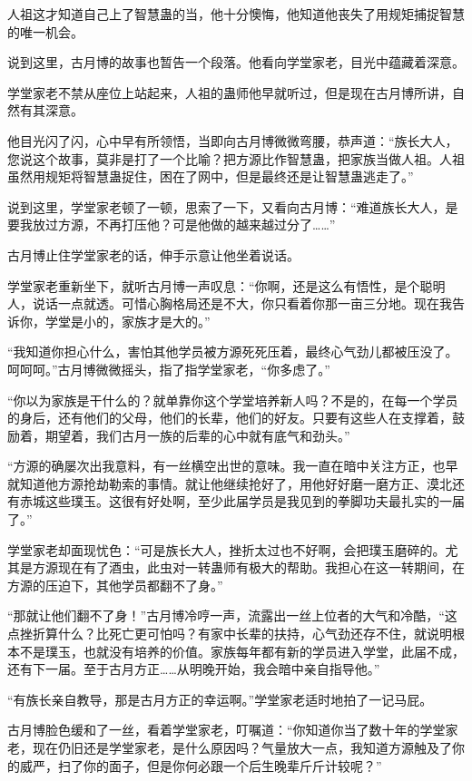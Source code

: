 \begin{this_body}
人祖这才知道自己上了智慧蛊的当，他十分懊悔，他知道他丧失了用规矩捕捉智慧的唯一机会。

说到这里，古月博的故事也暂告一个段落。他看向学堂家老，目光中蕴藏着深意。

学堂家老不禁从座位上站起来，人祖的蛊师他早就听过，但是现在古月博所讲，自然有其深意。

他目光闪了闪，心中早有所领悟，当即向古月博微微弯腰，恭声道：“族长大人，您说这个故事，莫非是打了一个比喻？把方源比作智慧蛊，把家族当做人祖。人祖虽然用规矩将智慧蛊捉住，困在了网中，但是最终还是让智慧蛊逃走了。”

说到这里，学堂家老顿了一顿，思索了一下，又看向古月博：“难道族长大人，是要我放过方源，不再打压他？可是他做的越来越过分了……”

古月博止住学堂家老的话，伸手示意让他坐着说话。

学堂家老重新坐下，就听古月博一声叹息：“你啊，还是这么有悟性，是个聪明人，说话一点就透。可惜心胸格局还是不大，你只看着你那一亩三分地。现在我告诉你，学堂是小的，家族才是大的。”

“我知道你担心什么，害怕其他学员被方源死死压着，最终心气劲儿都被压没了。呵呵呵。”古月博微微摇头，指了指学堂家老，“你多虑了。”

“你以为家族是干什么的？就单靠你这个学堂培养新人吗？不是的，在每一个学员的身后，还有他们的父母，他们的长辈，他们的好友。只要有这些人在支撑着，鼓励着，期望着，我们古月一族的后辈的心中就有底气和劲头。”

“方源的确屡次出我意料，有一丝横空出世的意味。我一直在暗中关注方正，也早就知道他方源抢劫勒索的事情。就让他继续抢好了，用他好好磨一磨方正、漠北还有赤城这些璞玉。这很有好处啊，至少此届学员是我见到的拳脚功夫最扎实的一届了。”

学堂家老却面现忧色：“可是族长大人，挫折太过也不好啊，会把璞玉磨碎的。尤其是方源现在有了酒虫，此虫对一转蛊师有极大的帮助。我担心在这一转期间，在方源的压迫下，其他学员都翻不了身。”

“那就让他们翻不了身！”古月博冷哼一声，流露出一丝上位者的大气和冷酷，“这点挫折算什么？比死亡更可怕吗？有家中长辈的扶持，心气劲还存不住，就说明根本不是璞玉，也就没有培养的价值。家族每年都有新的学员进入学堂，此届不成，还有下一届。至于古月方正……从明晚开始，我会暗中亲自指导他。”

“有族长亲自教导，那是古月方正的幸运啊。”学堂家老适时地拍了一记马屁。

古月博脸色缓和了一丝，看着学堂家老，叮嘱道：“你知道你当了数十年的学堂家老，现在仍旧还是学堂家老，是什么原因吗？气量放大一点，我知道方源触及了你的威严，扫了你的面子，但是你何必跟一个后生晚辈斤斤计较呢？”


\end{this_body}
